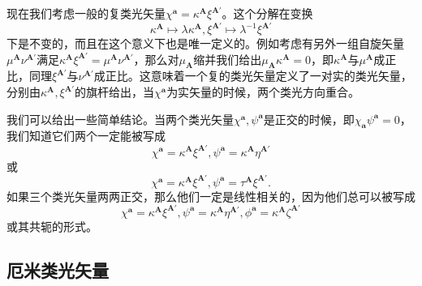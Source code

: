 现在我们考虑一般的复类光矢量$\chi ^{\boldsymbol{a}} =\kappa ^{\boldsymbol{A}} \xi ^{\boldsymbol{A} '}$。这个分解在变换
\begin{equation*}
	\kappa ^{\boldsymbol{A}} \mapsto \lambda \kappa ^{\boldsymbol{A}} ,\xi ^{\boldsymbol{A} '} \mapsto \lambda ^{-1} \xi ^{\boldsymbol{A} '}
\end{equation*}
下是不变的，而且在这个意义下也是唯一定义的。例如考虑有另外一组自旋矢量$\mu ^{\boldsymbol{A}} \nu ^{\boldsymbol{A} '}$满足$\kappa ^{\boldsymbol{A}} \xi ^{\boldsymbol{A} '} =\mu ^{\boldsymbol{A}} \nu ^{\boldsymbol{A} '}$，那么对$\mu _{\boldsymbol{A}}$缩并我们给出$\mu _{\boldsymbol{A}} \kappa ^{\boldsymbol{A}} =0$，即$\kappa ^{\boldsymbol{A}}$与$\mu ^{\boldsymbol{A}}$成正比，同理$\xi ^{\boldsymbol{A} '}$与$\nu ^{\boldsymbol{A} '}$成正比。这意味着一个复的类光矢量定义了一对实的类光矢量，分别由$\kappa ^{\boldsymbol{A}} ,\xi ^{\boldsymbol{A} '}$的旗杆给出，当$\chi ^{\boldsymbol{a}}$为实矢量的时候，两个类光方向重合。



我们可以给出一些简单结论。当两个类光矢量$\chi ^{\boldsymbol{a}} ,\psi ^{\boldsymbol{a}}$是正交的时候，即$\chi _{\boldsymbol{a}} \psi ^{\boldsymbol{a}} =0$，我们知道它们两个一定能被写成
\begin{equation*}
	\chi ^{\boldsymbol{a}} =\kappa ^{\boldsymbol{A}} \xi ^{\boldsymbol{A} '} ,\psi ^{\boldsymbol{a}} =\kappa ^{\boldsymbol{A}} \eta ^{\boldsymbol{A} '}
\end{equation*}
或
\begin{equation*}
	\chi ^{\boldsymbol{a}} =\kappa ^{\boldsymbol{A}} \xi ^{\boldsymbol{A} '} ,\psi ^{\boldsymbol{a}} =\tau ^{\boldsymbol{A}} \xi ^{\boldsymbol{A} '} .
\end{equation*}
如果三个类光矢量两两正交，那么他们一定是线性相关的，因为他们总可以被写成
\begin{equation*}
	\chi ^{\boldsymbol{a}} =\kappa ^{\boldsymbol{A}} \xi ^{\boldsymbol{A} '} ,\psi ^{\boldsymbol{a}} =\kappa ^{\boldsymbol{A}} \eta ^{\boldsymbol{A} '} ,\phi ^{\boldsymbol{a}} =\kappa ^{\boldsymbol{A}} \zeta ^{\boldsymbol{A} '}
\end{equation*}
或其共轭的形式。


\subsection{厄米类光矢量}

